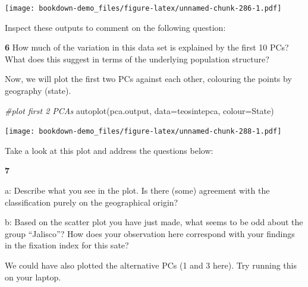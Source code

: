 \documentclass[
]{book}
\makeatletter
\newenvironment{Shaded}{\begin{snugshade}}{\end{snugshade}}
\newcommand{\AttributeTok}[1]{\textcolor[rgb]{0.77,0.63,0.00}{#1}}
\newcommand{\CommentTok}[1]{\textcolor[rgb]{0.56,0.35,0.01}{\textit{#1}}}
\newcommand{\FunctionTok}[1]{\textcolor[rgb]{0.00,0.00,0.00}{#1}}
\newcommand{\NormalTok}[1]{#1}
\newcommand{\StringTok}[1]{\textcolor[rgb]{0.31,0.60,0.02}{#1}}
\newenvironment{kframe}{%
\medskip{}
\setlength{\fboxsep}{.8em}
 \def\at@end@of@kframe{}%
 \ifinner\ifhmode%
  \def\at@end@of@kframe{\end{minipage}}%
  \begin{minipage}{\columnwidth}%
 \fi\fi%
 \def\FrameCommand##1{\hskip\@totalleftmargin \hskip-\fboxsep
 \colorbox{shadecolor}{##1}\hskip-\fboxsep
     \hskip-\linewidth \hskip-\@totalleftmargin \hskip\columnwidth}%
 \MakeFramed {\advance\hsize-\width
   \@totalleftmargin\z@ \linewidth\hsize
   \@setminipage}}%
 {\par\unskip\endMakeFramed%
 \at@end@of@kframe}
\newenvironment{rmdblock}[1]
  {
  \begin{itemize}
  \renewcommand{\labelitemi}{
    \raisebox{-.7\height}[0pt][0pt]{
      {\setkeys{Gin}{width=3em,keepaspectratio}\texttt{[image: images/\#1]}}
    }
  }
  \setlength{\fboxsep}{1em}
  \begin{kframe}
  \item
  }
  {
  \end{kframe}
  \end{itemize}
  }
\newenvironment{rmdquiz}
  {\begin{rmdblock}{quiz}}
  {\end{rmdblock}}
\makeatother
\begin{document}
\texttt{[image: bookdown-demo\_files/figure-latex/unnamed-chunk-286-1.pdf]}

Inspect these outputs to comment on the following question:

\begin{rmdquiz}
\textbf{6} How much of the variation in this data set is explained by the first 10 PCs? What does this suggest in terms of the underlying population structure?
\end{rmdquiz}

Now, we will plot the first two PCs against each other, colouring the points by geography (state).

\begin{Shaded}
\begin{Highlighting}[]
\CommentTok{\#plot first 2 PCAs}
\FunctionTok{autoplot}\NormalTok{(pca.output, }\AttributeTok{data=}\NormalTok{teosintepca, }\AttributeTok{colour=}\StringTok{\textquotesingle{}State\textquotesingle{}}\NormalTok{)}
\end{Highlighting}
\end{Shaded}

\texttt{[image: bookdown-demo\_files/figure-latex/unnamed-chunk-288-1.pdf]}

Take a look at this plot and address the questions below:

\begin{rmdquiz}
\textbf{7}

a: Describe what you see in the plot. Is there (some) agreement with the classification purely on the geographical origin?

b: Based on the scatter plot you have just made, what seems to be odd about the group ``Jalisco''? How does your observation here correspond with your findings in the fixation index for this sate?
\end{rmdquiz}

We could have also plotted the alternative PCs (1 and 3 here). Try running this on your laptop.
\end{document}
